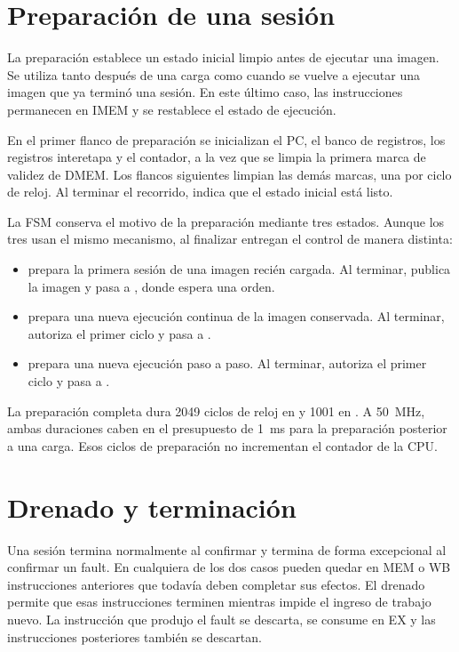 \section{Preparación de una sesión}

La preparación establece un estado inicial limpio antes de ejecutar una
imagen. Se utiliza tanto después de una carga como cuando se vuelve a ejecutar
una imagen que ya terminó una sesión. En este último caso, las instrucciones
permanecen en IMEM y se restablece el estado de ejecución.

En el primer flanco de preparación se inicializan el PC, el banco de registros,
los registros interetapa y el contador, a la vez que se limpia la primera marca
de validez de DMEM. Los flancos siguientes limpian las demás marcas, una por
ciclo de reloj. Al terminar el recorrido,  indica que el
estado inicial está listo.

La FSM conserva el motivo de la preparación mediante tres estados. Aunque los
tres usan el mismo mecanismo, al finalizar entregan el control de manera
distinta:

\begin{itemize}
  \item {} prepara la primera sesión de una imagen recién
    cargada. Al terminar, publica la imagen y pasa a , donde espera
    una orden.
  \item {} prepara una nueva ejecución continua de la imagen
    conservada. Al terminar, autoriza el primer ciclo y pasa a .
  \item {} prepara una nueva ejecución paso a paso. Al
    terminar, autoriza el primer ciclo y pasa a .
\end{itemize}

La preparación completa dura 2049 ciclos de reloj en  y 1001
en . A \SI{50}{\mega\hertz}, ambas duraciones caben en el
presupuesto de \SI{1}{\milli\second} para la preparación posterior a una carga.
Esos ciclos de preparación no incrementan el contador de la CPU.

\section{Drenado y terminación}

Una sesión termina normalmente al confirmar  y termina de forma
excepcional al confirmar un fault. En cualquiera de los dos casos pueden quedar
en MEM o WB instrucciones anteriores que todavía deben completar sus efectos.
El drenado permite que esas instrucciones terminen mientras impide el ingreso
de trabajo nuevo. La instrucción que produjo el fault se descarta, 
se consume en EX y las instrucciones posteriores también se descartan.

